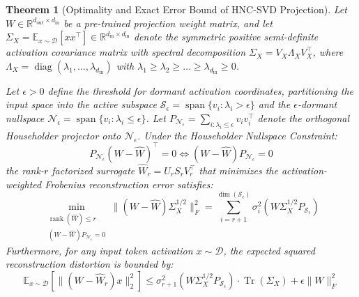 \documentclass{article}
\newtheorem{theorem}{Theorem}
\begin{document}
\begin{theorem}[Optimality and Exact Error Bound of HNC-SVD Projection]
\label{thm:hnc_svd_optimality}
Let $W \in \mathbb{R}^{d_{\text{out}} \times d_{\text{in}}}$ be a pre-trained projection weight matrix, and let $\Sigma_X = \mathbb{E}_{x \sim \mathcal{D}}[x x^\top] \in \mathbb{R}^{d_{\text{in}} \times d_{\text{in}}}$ denote the symmetric positive semi-definite activation covariance matrix with spectral decomposition $\Sigma_X = V_X \Lambda_X V_X^\top$, where $\Lambda_X = \operatorname{diag}(\lambda_1, \dots, \lambda_{d_{\text{in}}})$ with $\lambda_1 \ge \lambda_2 \ge \dots \ge \lambda_{d_{\text{in}}} \ge 0$. 

Let $\epsilon > 0$ define the threshold for dormant activation coordinates, partitioning the input space into the active subspace $\mathcal{S}_{\epsilon} = \operatorname{span}\{v_i : \lambda_i > \epsilon\}$ and the $\epsilon$-dormant nullspace $\mathcal{N}_\epsilon = \operatorname{span}\{v_i : \lambda_i \le \epsilon\}$. Let $P_{\mathcal{N}_\epsilon} = \sum_{i: \lambda_i \le \epsilon} v_i v_i^\top$ denote the orthogonal Householder projector onto $\mathcal{N}_\epsilon$. Under the Householder Nullspace Constraint:
\begin{equation}
    P_{\mathcal{N}_\epsilon} (W - \hat{W})^\top = 0 \iff (W - \hat{W}) P_{\mathcal{N}_\epsilon} = 0
\end{equation}
the rank-$r$ factorized surrogate $\hat{W}_r = U_r S_r V_r^\top$ that minimizes the activation-weighted Frobenius reconstruction error satisfies:
\begin{equation}
    \min_{\substack{\operatorname{rank}(\hat{W}) \le r \\ (W - \hat{W}) P_{\mathcal{N}_\epsilon} = 0}} \|(W - \hat{W}) \Sigma_X^{1/2}\|_F^2 = \sum_{i=r+1}^{\operatorname{dim}(\mathcal{S}_\epsilon)} \sigma_i^2(W \Sigma_X^{1/2} P_{\mathcal{S}_\epsilon})
\end{equation}
Furthermore, for any input token activation $x \sim \mathcal{D}$, the expected squared reconstruction distortion is bounded by:
\begin{equation}
    \mathbb{E}_{x \sim \mathcal{D}}\left[ \|(W - \hat{W}_r) x\|_2^2 \right] \le \sigma_{r+1}^2(W \Sigma_X^{1/2} P_{\mathcal{S}_\epsilon}) \cdot \operatorname{Tr}(\Sigma_X) + \epsilon \|W\|_F^2
\end{equation}
\end{theorem}
\end{document}

